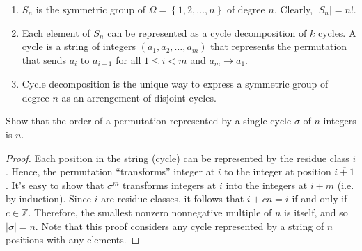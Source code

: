 \documentclass[12pt]{article}
\newcommand{\Z}{\mathbb{Z}}
\newenvironment{problem}[2][Problem]{\begin{trivlist} \item[\hskip \labelsep {\bfseries #1}\hskip \labelsep {\bfseries #2.}]}{\end{trivlist}}
\begin{document}
\begin{enumerate}
  \item $S_{n}$ is the symmetric group of $\Omega=\left\{ 1,2,\dots,n \right\}$ of degree $n$. Clearly, $|S_{n}|=n!$.
  \item Each element of $S_{n}$ can be represented as a cycle decomposition of $k$ cycles. A cycle is a string of integers $(a_{1},a_{2},\dots,a_{m})$ that represents the permutation that sends $a_{i}$ to $a_{i+1}$ for all $1\leq i<m$ and $a_{m}\to a_{1}$. \\
  \item Cycle decomposition is the unique way to express a symmetric group of degree $n$ as an arrengement of disjoint cycles.
\end{enumerate}
\begin{problem}{a}
  Show that the order of a permutation represented by a single cycle $\sigma$ of $n$ integers is $n$.
\begin{proof}
  Each position in the string (cycle) can be represented by the residue class $\overline{i}$. Hence, the permutation ``transforms''  integer at $\overline{i}$ to the integer at position $\overline{i+1}$. It's easy to show that $\sigma^{m}$ transforms integers at $\overline{i}$ into the integers at $\overline{i+m}$ (i.e. by induction). Since $\overline{i}$ are residue classes, it follows that $\overline{i+cn} = \overline{i}$ if and only if $c\in \Z$. Therefore, the smallest nonzero nonnegative multiple of $n$ is itself, and so $|\sigma|=n$. Note that this proof considers any cycle represented by a string of $n$ positions with any elements.
\end{proof}
\end{problem}
\end{document}
